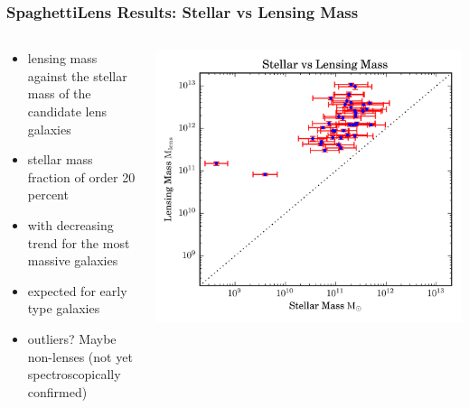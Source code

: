 \documentclass{beamer}
\begin{document}
 \begin{frame}
   \frametitle{SpaghettiLens Results: Stellar vs Lensing Mass}

   \begin{columns}[c]
   \begin{column}{0.5\textwidth}
     \begin{itemize}
       \item lensing mass against the stellar mass of the candidate lens galaxies
       \item stellar mass fraction of order 20 percent
       \item with decreasing trend for the most massive galaxies
       \item expected for early type galaxies
       \item outliers? Maybe non-lenses (not yet spectroscopically confirmed)
     \end{itemize}
 
   \end{column}\begin{column}{0.5\textwidth}
     \includegraphics[width=\textwidth]{imgs/plot}
   \end{column}
   \end{columns}

 \end{frame}
\end{document}

